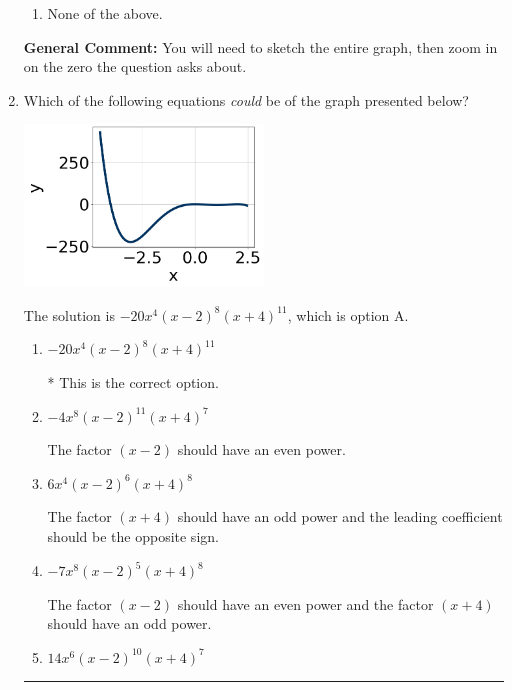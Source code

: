 \documentclass{extbook}[14pt]
\newcommand{\litem}[1]{\item #1

\rule{\textwidth}{0.4pt}}
\begin{document}
\begin{enumerate}
{\begin{enumerate}[label=\Alph*.]
\item None of the above.\end{enumerate}
\textbf{General Comment:} You will need to sketch the entire graph, then zoom in on the zero the question asks about.
}
\litem{
Which of the following equations \textit{could} be of the graph presented below?

\begin{center}
    \includegraphics[width=0.5\textwidth]{../Figures/polyGraphToFunctionCopyC.png}
\end{center}


The solution is \( -20x^{4} (x - 2)^{8} (x + 4)^{11} \), which is option A.\begin{enumerate}[label=\Alph*.]
\item \( -20x^{4} (x - 2)^{8} (x + 4)^{11} \)

* This is the correct option.
\item \( -4x^{8} (x - 2)^{11} (x + 4)^{7} \)

The factor $(x - 2)$ should have an even power.
\item \( 6x^{4} (x - 2)^{6} (x + 4)^{8} \)

The factor $(x + 4)$ should have an odd power and the leading coefficient should be the opposite sign.
\item \( -7x^{8} (x - 2)^{5} (x + 4)^{8} \)

The factor $(x - 2)$ should have an even power and the factor $(x + 4)$ should have an odd power.
\item \( 14x^{6} (x - 2)^{10} (x + 4)^{7} \)


\end{enumerate}}
\end{enumerate}
\end{document}
